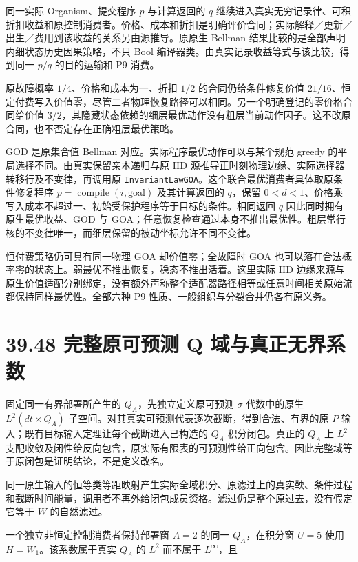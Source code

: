 \documentclass[
  11pt,
  oneside]{book}
\begin{document}
同一实际 Organism、提交程序 \(p\) 与计算返回的 \(q\) 继续进入真实无穷记录律、可积折扣收益和原控制消费者。价格、成本和折扣是明确评价合同；实际解释／更新／出生／费用到该收益的关系另由源推导。原原生 Bellman 结果比较的是全部声明内细状态历史因果策略，不只 Bool 编译器类。由真实记录收益等式与该比较，得到同一 \(p/q\) 的目的运输和 P9 消费。

原故障概率 \(1/4\)、价格和成本为一、折扣 \(1/2\) 的合同仍给条件修复价值 \(21/16\)、恒定付费写入价值零，尽管二者物理恢复路径可以相同。另一个明确登记的零价格合同给价值 \(3/2\)，其隐藏状态依赖的细层最优动作没有粗层当前动作因子。这不改原合同，也不否定存在正确粗层最优策略。

GOD 是原集合值 Bellman 对应。实际程序最优动作可以与某个规范 greedy 的平局选择不同。由真实保留亲本递归与原 IID 源推导正时刻物理边缘、实际选择器转移行及不变律，再调用原 \nolinkurl{InvariantLawGOA}。这个联合最优消费者具体取原条件修复程序 \(p=\operatorname{compile}(i,\mathrm{goal})\) 及其计算返回的 \(q\)，保留 \(0<d<1\)、价格乘写入成本不超过一、初始受保护程序等于目标的条件。相同返回 \(q\) 因此同时拥有原生最优收益、GOD 与 GOA；任意恢复检查通过本身不推出最优性。粗层常行核的不变律唯一，而细层保留的被动坐标允许不同不变律。

恒付费策略仍可具有同一物理 GOA 却价值零；全故障时 GOA 也可以落在合法概率零的状态上。弱最优不推出恢复，稳态不推出活着。这里实际 IID 边缘来源与原生价值适配分别绑定，没有额外声称整个适配器路径相等或任意时间相关原始流都保持同样最优性。全部六种 P9 性质、一般组织与分裂合并仍各有原义务。

\section{39.48 完整原可预测 Q 域与真正无界系数}\label{ux5b8cux6574ux539fux53efux9884ux6d4b-q-ux57dfux4e0eux771fux6b63ux65e0ux754cux7cfbux6570}

固定同一有界部署所产生的 \(Q_A\)，先独立定义原可预测 \(\sigma\) 代数中的原生 \(L^2(dt\times Q_A)\) 子空间。对其真实可预测代表逐次截断，得到合法、有界的原 \(P\) 输入；既有目标输入定理让每个截断进入已构造的 \(Q_A\) 积分闭包。真正的 \(Q_A\) 上 \(L^2\) 支配收敛及闭性给反向包含，原实际有限表的可预测性给正向包含。因此完整域等于原闭包是证明结论，不是定义改名。

同一原生输入的恒等类等距映射产生实际全域积分、原滤过上的真实鞅、条件过程和截断时间能量，调用者不再外给闭包成员资格。滤过仍是整个原过去，没有假定它等于 \(W\) 的自然滤过。

一个独立非恒定控制消费者保持部署窗 \(A=2\) 的同一 \(Q_A\)，在积分窗 \(U=5\) 使用 \(H=W_1\)。该系数属于真实 \(Q_A\) 的 \(L^2\) 而不属于 \(L^\infty\)，且
\end{document}
